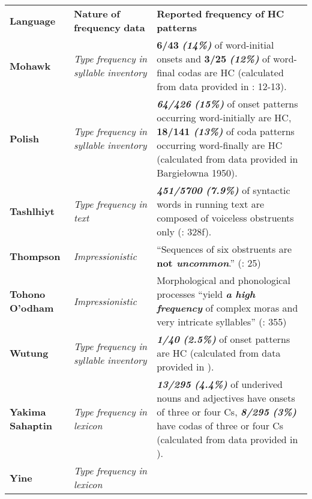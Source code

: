 \begin{table}
\begin{tabularx}{\textwidth}{XXX}
\lsptoprule

\textbf{Language} & \textbf{Nature} \textbf{of} \textbf{frequency} \textbf{data} & \textbf{Reported} \textbf{frequency} \textbf{of} \textbf{HC} \textbf{patterns}\\
\textbf{Mohawk} & \textit{Type} \textit{frequency} \textit{in} \textit{syllable} \textit{inventory} & \textbf{6/43} \textbf{\textit{(14\%)}} of word-initial onsets and \textbf{3/25} \textbf{\textit{(12\%)}} of word-final codas are HC (calculated from data provided in \citealt{Michelson1988}: 12-13).\\
\textbf{Polish} & \textit{Type} \textit{frequency} \textit{in} \textit{syllable} \textit{inventory} & \textbf{\textit{64/426} \textit{(15\%)}} of onset patterns occurring word-initially are HC,\textbf{ \textbf{18/141} \textit{(13\%)}} of coda patterns occurring word-finally are HC (calculated from data provided in Bargiełowna 1950).\\
{\bfseries Tashlhiyt} & \textit{Type} \textit{frequency} \textit{in} \textit{text} & \textbf{\textit{451/5700} \textit{(7.9\%)}} of syntactic words in running text are composed of voiceless obstruents only (\citealt{Ridouane2008}: 328f).\\
\textbf{Thompson} & \textit{Impressionistic} & “Sequences of six obstruents are\textbf{ \textbf{not} \textit{uncommon}}.” (\citealt{ThompsonThompson1992}: 25)\\
\textbf{Tohono} \textbf{O’odham} & \textit{Impressionistic} & Morphological and phonological processes “yield \textbf{\textit{a} \textit{high} \textit{frequency}} of complex moras and very intricate syllables” (\citealt{HillZepeda1992}: 355)\\
\textbf{Wutung} & \textit{Type} \textit{frequency} \textit{in} \textit{syllable} \textit{inventory} & \textbf{\textit{1/40} \textit{(2.5\%)} }of\textbf{ }onset patterns are HC (calculated from data provided in \citealt{Marmion2010}).\\
\textbf{Yakima} \textbf{Sahaptin} & \textit{Type} \textit{frequency} \textit{in} \textit{lexicon} & \textbf{\textit{13/295} \textit{(4.4\%)}} of underived nouns and adjectives have onsets of three or four Cs, \textbf{\textit{8/295} \textit{(3\%)}} have codas of three or four Cs (calculated from data provided in \citealt{HargusBeavert2006}).\\
\textbf{Yine} & \textit{Type} \textit{frequency} \textit{in} \textit{lexicon}


\end{tabularx}
\end{table}
